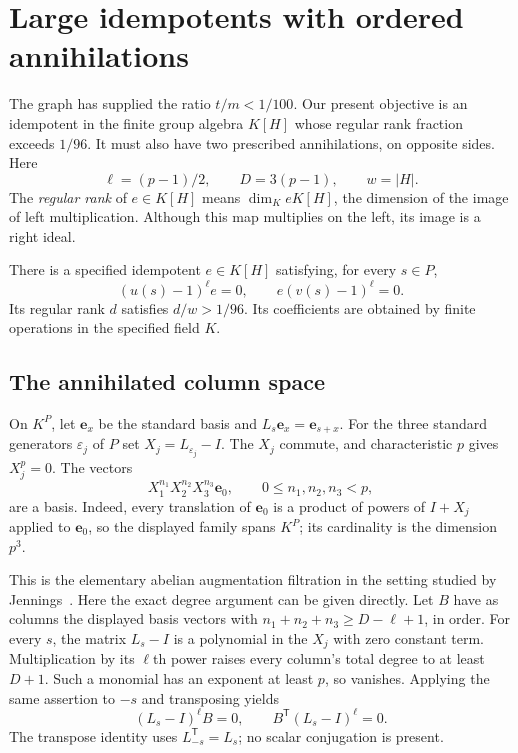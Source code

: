 \section{Large idempotents with ordered annihilations}
\label{op:modular-section}

The graph has supplied the ratio $t/m<1/100$. Our present objective is
an idempotent in the finite group algebra $K[H]$ whose regular rank
fraction exceeds $1/96$. It must also have two prescribed annihilations,
on opposite sides. Here
\[
 \ell=(p-1)/2,\qquad D=3(p-1),\qquad w=|H|.
\]
The \emph{regular rank} of $e\in K[H]$ means
$\dim_K eK[H]$, the dimension of the image of left multiplication.
Although this map multiplies on the left, its image is a right ideal.

\begin{proposition}\label{op:modular}
There is a specified idempotent $e\in K[H]$ satisfying, for every $s\in P$,
\[
 (u(s)-1)^\ell e=0,\qquad e(v(s)-1)^\ell=0.
\]
Its regular rank $d$ satisfies $d/w>1/96$. Its coefficients are obtained
by finite operations in the specified field $K$.
\end{proposition}

\subsection{The annihilated column space}

On $K^P$, let $\mathbf e_x$ be the standard basis and
$L_s\mathbf e_x=\mathbf e_{s+x}$. For the three standard generators
$\varepsilon_j$ of $P$ set $X_j=L_{\varepsilon_j}-I$. The $X_j$ commute,
and characteristic $p$ gives $X_j^p=0$. The vectors
\[
 X_1^{n_1}X_2^{n_2}X_3^{n_3}\mathbf e_0,
 \qquad 0\le n_1,n_2,n_3<p,
\]
are a basis. Indeed, every translation of $\mathbf e_0$ is a product of
powers of $I+X_j$ applied to $\mathbf e_0$, so the displayed family spans
$K^P$; its cardinality is the dimension $p^3$.

This is the elementary abelian augmentation filtration in the setting
studied by Jennings~\cite{Jennings1941}. Here the exact degree argument
can be given directly. Let $B$ have as columns the displayed basis
vectors with $n_1+n_2+n_3\ge D-\ell+1$, in order. For every $s$, the
matrix $L_s-I$ is a polynomial in the $X_j$ with zero constant term.
Multiplication by its $\ell$th power raises every column's total degree
to at least $D+1$. Such a monomial has an exponent at least $p$, so
vanishes. Applying the same assertion to $-s$ and transposing yields
\begin{equation}\label{op:B-annihilation}
 (L_s-I)^\ell B=0,\qquad B^{\mathsf T}(L_s-I)^\ell=0.
\end{equation}
The transpose identity uses $L_{-s}^{\mathsf T}=L_s$; no scalar
conjugation is present.

